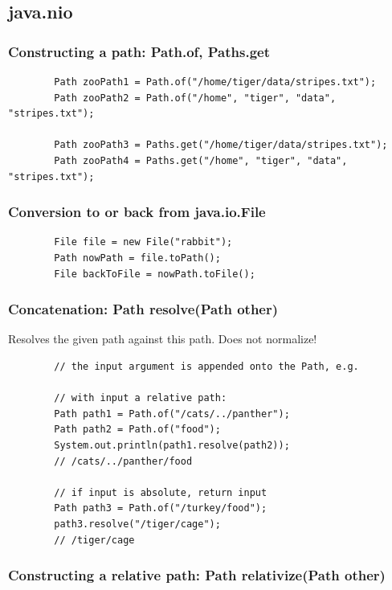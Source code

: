 \documentclass{scrartcl}
\begin{document}
\subsection{java.nio}

\subsubsection{Constructing a path: Path.of, Paths.get}

    \begin{lstlisting}
        Path zooPath1 = Path.of("/home/tiger/data/stripes.txt");
        Path zooPath2 = Path.of("/home", "tiger", "data", "stripes.txt");

        Path zooPath3 = Paths.get("/home/tiger/data/stripes.txt");
        Path zooPath4 = Paths.get("/home", "tiger", "data", "stripes.txt");
    \end{lstlisting}

\subsubsection{Conversion to or back from java.io.File}

    \begin{lstlisting}
        File file = new File("rabbit");
        Path nowPath = file.toPath();
        File backToFile = nowPath.toFile();
    \end{lstlisting}

\subsubsection{Concatenation: Path resolve(Path other)}

    Resolves the given path against this path. Does not normalize!

    \begin{lstlisting}
        // the input argument is appended onto the Path, e.g.

        // with input a relative path:
        Path path1 = Path.of("/cats/../panther");
        Path path2 = Path.of("food");
        System.out.println(path1.resolve(path2));
        // /cats/../panther/food

        // if input is absolute, return input
        Path path3 = Path.of("/turkey/food");
        path3.resolve("/tiger/cage");
        // /tiger/cage
    \end{lstlisting}

\subsubsection{Constructing a relative path: Path relativize(Path other)}
\end{document}
